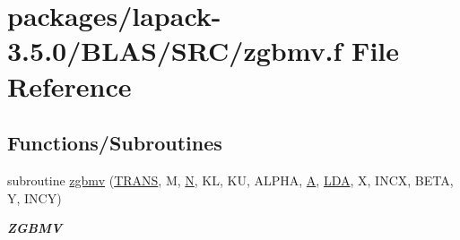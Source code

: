 \hypertarget{lapack-3_85_80_2BLAS_2SRC_2zgbmv_8f}{}\section{packages/lapack-\/3.5.0/\+B\+L\+A\+S/\+S\+R\+C/zgbmv.f File Reference}
\label{lapack-3_85_80_2BLAS_2SRC_2zgbmv_8f}
\subsection*{Functions/\+Subroutines}
\begin{DoxyCompactItemize}
\item 
subroutine \hyperlink{group__complex16__blas__level2_gab289624f8fdc44e20c5ab79f9cc1f631}{zgbmv} (\hyperlink{superlu__enum__consts_8h_a0c4e17b2d5cea33f9991ccc6a6678d62a1f61e3015bfe0f0c2c3fda4c5a0cdf58}{T\+R\+A\+N\+S}, M, \hyperlink{polmisc_8c_a0240ac851181b84ac374872dc5434ee4}{N}, K\+L, K\+U, A\+L\+P\+H\+A, \hyperlink{classA}{A}, \hyperlink{example__user_8c_ae946da542ce0db94dced19b2ecefd1aa}{L\+D\+A}, X, I\+N\+C\+X, B\+E\+T\+A, Y, I\+N\+C\+Y)
\begin{DoxyCompactList}\small\item\em {\bfseries Z\+G\+B\+M\+V} \end{DoxyCompactList}\end{DoxyCompactItemize}

